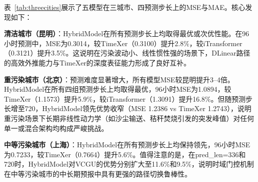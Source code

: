 \documentclass[12pt,a4paper]{article}
\begin{document}
表~\ref{tab:threecities}展示了五模型在三城市、四预测步长上的MSE与MAE。核心发现如下：

\textbf{清洁城市（昆明）}：HybridModel在所有预测步长上均取得最优或次优性能。在96小时预测中，MSE为0.3014，较TimeXer（0.3100）提升2.8\%，较iTransformer（0.3121）提升3.5\%。这说明在污染波动小、线性惯性强的场景下，DLinear路径的高效外推能力与TimeXer的深度表征能力形成了良好互补。

\textbf{重污染城市（北京）}：预测难度显著增大，所有模型MSE较昆明提升3--4倍。HybridModel在所有四组预测步长上均取得最优，96小时MSE为1.0894，较TimeXer（1.1573）提升5.9\%，较iTransformer（1.3091）提升16.8\%。但随预测步长增至720，HybridModel领先优势收窄（MSE 1.2386 vs TimeXer 1.2743），说明重污染场景下长期非线性动力学（如沙尘输送、秸秆焚烧引发的突发峰值）对任何单一或混合架构均构成严峻挑战。

\textbf{中等污染城市（上海）}：HybridModel在所有预测步长上均保持领先，96小时MSE为0.7233，较TimeXer（0.7664）提升5.6\%。值得注意的是，在pred\_len=336和720时，HybridModel对VCGU的优势分别扩大至11.6\%和9.5\%，说明时域门控机制在中等污染城市的中长期预报中具有更强的路径切换鲁棒性。
\end{document}
